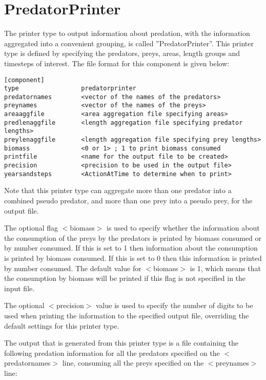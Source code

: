 \documentclass[10pt,twoside]{book}
\begin{document}
\section{PredatorPrinter}\label{sec:predatorprinter}
The printer type to output information about predation, with the information aggregated into a convenient grouping, is called ''PredatorPrinter''.  This printer type is defined by specifying the predators, preys, areas, length groups and timesteps of interest.  The file format for this component is given below:

{\small\begin{verbatim}
[component]
type                 predatorprinter
predatornames        <vector of the names of the predators>
preynames            <vector of the names of the preys>
areaaggfile          <area aggregation file specifying areas>
predlenaggfile       <length aggregation file specifying predator lengths>
preylenaggfile       <length aggregation file specifying prey lengths>
biomass              <0 or 1> ; 1 to print biomass consumed
printfile            <name for the output file to be created>
precision            <precision to be used in the output file>
yearsandsteps        <ActionAtTime to determine when to print>
\end{verbatim}}

Note that this printer type can aggregate more than one predator into a combined pseudo predator, and more than one prey into a pseudo prey, for the output file.

\bigskip
The optional flag $<$biomass$>$ is used to specify whether the information about the consumption of the preys by the predators is printed by biomass consumed or by number consumed.  If this is set to 1 then information about the consumption is printed by biomass consumed.  If this is set to 0 then this information is printed by number consumed.  The default value for $<$biomass$>$ is 1, which means that the consumption by biomass will be printed if this flag is not specified in the input file.

\bigskip
The optional $<$precision$>$ value is used to specify the number of digits to be used when printing the information to the specified output file, overriding the default settings for this printer type.

\bigskip
The output that is generated from this printer type is a file containing the following predation information for all the predators specified on the $<$predatornames$>$ line, consuming all the preys specified on the $<$preynames$>$ line:
\end{document}
